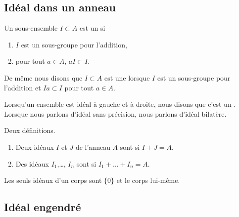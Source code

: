 \subsection{Idéal dans un anneau}

\begin{definition}  \label{DefooQULAooREUIU}
	Un sous-ensemble \( I\subset A\) est un  si
	\begin{enumerate}
		\item
		      \( I\) est un sous-groupe pour l'addition,
		\item
		      pour tout \( a\in A\), \( aI\subset I\).
	\end{enumerate}
	De même nous disons que \( I\subset A\) est une  lorsque \( I\) est un sous-groupe pour l'addition et \( Ia\subset I\) pour tout \( a\in A\).

	Lorsqu'un ensemble est idéal à gauche et à droite, nous disons que c'est un . Lorsque nous parlons d'idéal sans précision, nous parlons d'idéal bilatère.
\end{definition}

\begin{definition}	\label{DEFooZFYSooJGZndS}
	Deux définitions.
	\begin{enumerate}
		\item
		      Deux idéaux \( I\) et \( J\) de l'anneau \( A\) sont  si \( I+J=A\).
		\item
		      Des idéaux \( I_1\),\ldots, \( I_n\) sont  si \( I_1+\ldots+I_n=A\).
	\end{enumerate}
\end{definition}


\begin{lemma}		\label{LEMooMAHXooXSowdn}
	Les seuls idéaux d'un corps sont \( \{ 0 \}\) et le corps lui-même.
\end{lemma}

\subsection{Idéal engendré}


